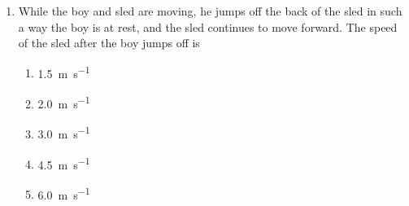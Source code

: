 \documentclass{../../../oss-apphys}
\begin{document}
\begin{multicols}{2}
\begin{enumerate}[resume,leftmargin=18pt]
  \item While the boy and sled are moving, he jumps off the back of the sled in
    such a way the boy is at rest, and the sled continues to move forward.
    The speed of the sled after the boy jumps off is
    \label{boy2}
    \begin{enumerate}[noitemsep,topsep=0pt,leftmargin=18pt,label=(\Alph*)]
    \item\SI{1.5}{\metre\per\second}
    \item\SI{2.0}{\metre\per\second}
    \item\SI{3.0}{\metre\per\second}
    \item\SI{4.5}{\metre\per\second}
    \item\SI{6.0}{\metre\per\second}
    \end{enumerate}
  \end{enumerate}


\end{multicols}
\end{document}

